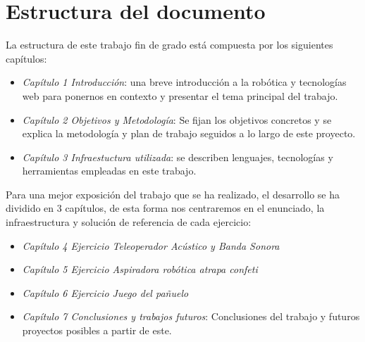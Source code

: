 \newpage
\section{Estructura del documento}

La estructura de este trabajo fin de grado está compuesta por los siguientes capítulos:

\begin{itemize}
    \item \textit{Capítulo 1 Introducción}: una breve introducción a la robótica y tecnologías web para ponernos en contexto y presentar el tema principal del trabajo.
    \item \textit{Capítulo 2 Objetivos y Metodología}: Se fijan los objetivos concretos y se explica la metodología y plan de trabajo seguidos a lo largo de este proyecto.
    \item \textit{Capítulo 3 Infraestuctura utilizada}: se describen lenguajes, tecnologías y herramientas empleadas en este trabajo.
\end{itemize}

Para una mejor exposición del trabajo que se ha realizado, el desarrollo se ha dividido en 3 capítulos, de esta forma nos centraremos en el enunciado, la infraestructura y solución de referencia de cada ejercicio:
    
\begin{itemize}
   \item \textit{Capítulo 4 Ejercicio Teleoperador Acústico y Banda Sonora}
    \item \textit{Capítulo 5 Ejercicio Aspiradora robótica atrapa confeti}
    
    \item \textit{Capítulo 6 Ejercicio Juego del pañuelo}

    
    \item \textit{Capítulo 7 Conclusiones y trabajos futuros}: Conclusiones del trabajo y futuros proyectos posibles a partir de este.
  \end{itemize}
